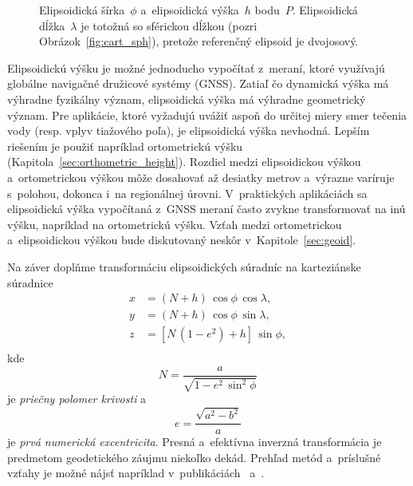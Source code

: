 \documentclass[a4paper, 12pt]{book}
\begin{document}
\begin{figure}[bt]
\centering

\caption{Elipsoidická šírka~$\phi$ a~elipsoidická výška~$h$ bodu~$P$.  
Elipsoidická dĺžka~$\lambda$ je totožná so sférickou dĺžkou (pozri 
Obrázok~\ref{fig:cart_sph}), pretože referenčný elipsoid je dvojosový.}
\label{fig:ell_coords}
\end{figure}

Elipsoidickú výšku je možné jednoducho vypočítať z~meraní, ktoré využívajú 
globálne navigačné družicové systémy (GNSS).  Zatiaľ čo dynamická výška má 
výhradne fyzikálny význam, elipsoidická výška má výhradne geometrický význam.  
Pre aplikácie, ktoré vyžadujú uvážiť aspoň do určitej miery smer tečenia vody 
(resp. vplyv tiažového poľa), je elipsoidická výška nevhodná.  Lepším riešením 
je použiť napríklad ortometrickú výšku (Kapitola~\ref{sec:orthometric_height}).  
Rozdiel medzi elipsoidickou výškou a~ortometrickou výškou môže dosahovať až 
desiatky metrov a~výrazne varíruje s~polohou, dokonca i~na regionálnej úrovni.  
V~praktických aplikáciách sa elipsoidická výška vypočítaná z~GNSS meraní často 
zvykne transformovať na inú výšku, napríklad na ortometrickú výšku.  Vzťah 
medzi ortometrickou a~elipsoidickou výškou bude diskutovaný neskôr 
v~Kapitole~\ref{sec:geoid}.

Na záver doplňme transformáciu elipsoidických súradníc na karteziánske 
súradnice \parencite{MoritzPhysicalGeodesy}
%
\begin{equation}
\begin{split}
x &= (N + h) \, \cos\phi \, \cos\lambda{,}\\
y &= (N + h) \, \cos\phi \, \sin\lambda{,}\\
z &= \left[ N \, (1 - e^2) + h \right] \, \sin\phi{,}\\
\end{split}
\end{equation}
%
kde
%
\begin{equation}
N = \frac{a}{\sqrt{1 - e^2 \, \sin^2\phi}}
\end{equation}
%
je \emph{priečny polomer krivosti} a
%
\begin{equation}
\label{eq:1st_eccentricity}
e = \frac{\sqrt{a^2 - b^2}}{a}
\end{equation}
%
je \emph{prvá numerická excentricita}.  Presná a~efektívna inverzná 
transformácia je predmetom geodetického záujmu niekoľko dekád.  Prehľad metód 
a~príslušné vzťahy je možné nájsť napríklad 
v~publikáciách~\textcite{Fukushima2006} a~\textcite{Claessens2019}.
\end{document}
